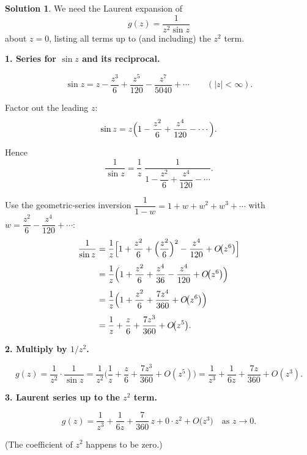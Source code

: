 \documentclass[12pt]{article}
\theoremstyle{definition} %
\newtheorem{solution}{Solution}
\theoremstyle{plain} %
\begin{document}
  \begin{solution}
    We need the Laurent expansion of
    \[
       g(z)=\frac{1}{z^{2}\sin z}
    \]
    about \(z=0\), listing all terms up to (and including) the \(z^{2}\) term.
    
    \bigskip
    \textbf{1.  Series for \(\sin z\) and its reciprocal.}
    
    \[
       \sin z
       = z-\frac{z^{3}}{6}+\frac{z^{5}}{120}-\frac{z^{7}}{5040}+\dotsb
       \qquad(|z|<\infty).
    \]
    
    Factor out the leading \(z\):
    \[
       \sin z
       =z\Bigl(1-\frac{z^{2}}{6}+\frac{z^{4}}{120}-\dotsb\Bigr).
    \]
    
    Hence
    \[
    \frac{1}{\sin z}
       =\frac{1}{z}\;
        \frac{1}{1-\dfrac{z^{2}}{6}+\dfrac{z^{4}}{120}-\dotsb}.
    \]
    
    Use the geometric‑series inversion
    \(
       \dfrac{1}{1-w}=1+w+w^{2}+w^{3}+\dotsb
    \)
    with
    \(w=\dfrac{z^{2}}{6}-\dfrac{z^{4}}{120}+\dotsb\):
    \[
    \begin{aligned}
    \frac{1}{\sin z}
     &=\frac{1}{z}
       \Bigl[
          1+\frac{z^{2}}{6}
            +\Bigl(\frac{z^{2}}{6}\Bigr)^{2}
            -\frac{z^{4}}{120}
            +O\!\bigl(z^{6}\bigr)
       \Bigr]\\[4pt]
     &=\frac{1}{z}
       \Bigl(
          1+\frac{z^{2}}{6}+\frac{z^{4}}{36}-\frac{z^{4}}{120}
          +O\!\bigl(z^{6}\bigr)
       \Bigr)\\[4pt]
     &=\frac{1}{z}
       \Bigl(
          1+\frac{z^{2}}{6}+\frac{7z^{4}}{360}+O\!\bigl(z^{6}\bigr)
       \Bigr)\\[4pt]
     &=\frac{1}{z}+\frac{z}{6}+\frac{7z^{3}}{360}+O\!\bigl(z^{5}\bigr).
    \end{aligned}
    \]
    
    \bigskip
    \textbf{2.  Multiply by \(1/z^{2}\).}
    
    \[
       g(z)=\frac{1}{z^{2}}\cdot\frac{1}{\sin z}
            =\frac{1}{z^{2}}
             \biggl(
               \frac{1}{z}+\frac{z}{6}+\frac{7z^{3}}{360}+O(z^{5})
             \biggr)
            =\frac{1}{z^{3}}+\frac{1}{6z}+\frac{7z}{360}+O(z^{3}).
    \]
    
    \bigskip
    \textbf{3.  Laurent series up to the \(z^{2}\) term.}
    
    \[
    \boxed{\displaystyle
       g(z)=\frac{1}{z^{3}}+\frac{1}{6z}+\frac{7}{360}\,z
            +0\cdot z^{2}+O\!\bigl(z^{3}\bigr)
       \quad\text{as }z\to0 }.
    \]
    
    (The coefficient of \(z^{2}\) happens to be zero.)
    \end{solution}
\end{document}
